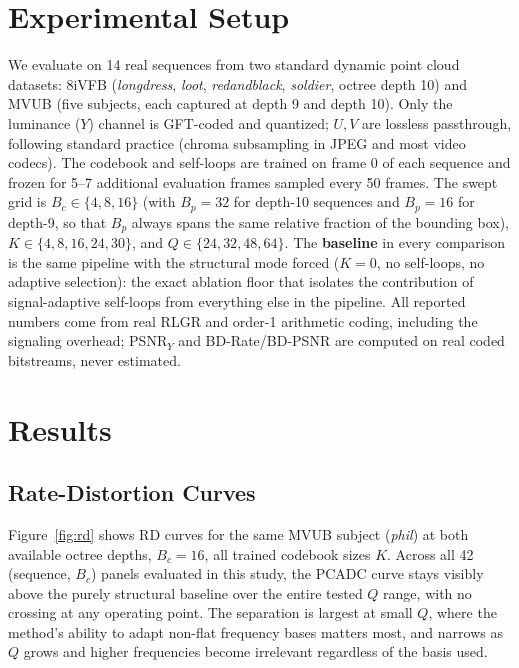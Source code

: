 \documentclass[conference]{IEEEtran}
\begin{document}
\section{Experimental Setup}
We evaluate on 14 real sequences from two standard dynamic point cloud datasets: 8iVFB
(\textit{longdress}, \textit{loot}, \textit{redandblack}, \textit{soldier}, octree depth 10) and
MVUB (five subjects, each captured at depth 9 and depth 10). Only the luminance ($Y$) channel is
GFT-coded and quantized; $U,V$ are lossless passthrough, following standard practice
(chroma subsampling in JPEG and most video codecs). The codebook and self-loops are trained on
frame 0 of each sequence and frozen for 5--7 additional evaluation frames sampled every 50
frames. The swept grid is $B_c\in\{4,8,16\}$ (with $B_p=32$ for depth-10 sequences and
$B_p=16$ for depth-9, so that $B_p$ always spans the same relative fraction of the bounding
box), $K\in\{4,8,16,24,30\}$, and $Q\in\{24,32,48,64\}$. The \textbf{baseline} in every
comparison is the same pipeline with the structural mode forced ($K{=}0$, no self-loops, no
adaptive selection): the exact ablation floor that isolates the contribution of signal-adaptive
self-loops from everything else in the pipeline. All reported numbers come from real RLGR and
order-1 arithmetic coding, including the signaling overhead; PSNR$_Y$ and BD-Rate/BD-PSNR
\cite{bjontegaard2001calculation} are computed on real coded bitstreams, never estimated.

\section{Results}
\label{sec:results}

\subsection{Rate-Distortion Curves}
Figure~\ref{fig:rd} shows RD curves for the same MVUB subject (\textit{phil}) at both available
octree depths, $B_c=16$, all trained codebook sizes $K$. Across all 42 (sequence, $B_c$) panels
evaluated in this study, the PCADC curve stays visibly above the purely structural baseline over
the entire tested $Q$ range, with no crossing at any operating point. The separation is largest
at small $Q$, where the method's ability to adapt non-flat frequency bases matters most, and
narrows as $Q$ grows and higher frequencies become irrelevant regardless of the basis used.
\end{document}
